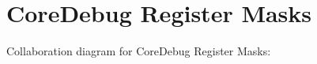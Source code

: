 \hypertarget{group___core_debug___register___masks}{}\section{Core\+Debug Register Masks}
\label{group___core_debug___register___masks}
Collaboration diagram for Core\+Debug Register Masks\+:

